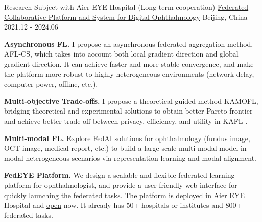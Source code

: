 \begin{cventries}
\cventry
{Research Subject with Aier EYE Hospital (Long-term cooperation)} %
{\href{https://fedeye.aierchina.com/}{Federated Collaborative Platform and System for Digital Ophthalmology}} %
{Beijing, China} %
{2021.12 - 2024.06} %
{
    \begin{cvitems}
        \item {\textbf{Asynchronous FL.} I propose an asynchronous federated aggregation method, AFL-CS, which takes into account both local gradient direction and global gradient direction. It can achieve faster and more stable convergence, and make the platform more robust to highly heterogeneous environments (network delay, computer power, offline, etc.).}
        \item {\textbf{Multi-objective Trade-offs.} I propose a theoretical-guided method KAMOFL, bridging theoretical and experimental solutions to obtain better Pareto frontier and achieve better trade-off between privacy, efficiency, and utility in KAFL .}
        \item {\textbf{Multi-modal FL.} Explore FedAI solutions for ophthalmology (fundus image, OCT image, medical report, etc.) to build a large-scale multi-modal model in modal heterogeneous scenarios via representation learning and modal alignment.}
        \item {\textbf{FedEYE Platform.} We design a scalable and flexible federated learning platform for ophthalmologist, 
            and provide a user-friendly web interface for quickly launching the federated tasks. 
            The platform is deployed in Aier EYE Hospital and \textcolor{awesome-red}{\href{https://fedeye.aierchina.com/}{open}} now. 
            It already has 50+ hospitals or institutes and 800+ federated tasks.}
    \end{cvitems}
}


\end{cventries}
